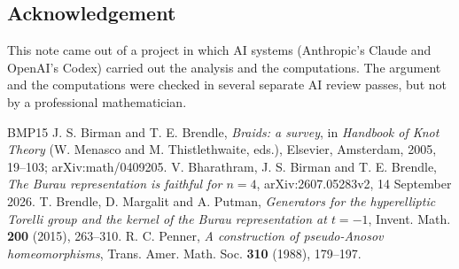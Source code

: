 \documentclass[11pt]{amsart}
\theoremstyle{remark}
\begin{document}
\subsection*{Acknowledgement}
This note came out of a project in which AI systems (Anthropic's Claude and OpenAI's Codex) carried out the analysis and the computations. The argument and the computations were checked in several separate AI review passes, but not by a professional mathematician.

\begin{thebibliography}{BMP15}
 J. S. Birman and T. E. Brendle, \emph{Braids: a survey}, in \emph{Handbook of Knot Theory} (W. Menasco and M. Thistlethwaite, eds.), Elsevier, Amsterdam, 2005, 19--103; arXiv:math/0409205.
 V. Bharathram, J. S. Birman and T. E. Brendle, \emph{The Burau representation is faithful for $n=4$}, arXiv:2607.05283v2, 14 September 2026.
 T. Brendle, D. Margalit and A. Putman, \emph{Generators for the hyperelliptic Torelli group and the kernel of the Burau representation at $t=-1$}, Invent. Math. \textbf{200} (2015), 263--310.
 R. C. Penner, \emph{A construction of pseudo-Anosov homeomorphisms}, Trans. Amer. Math. Soc. \textbf{310} (1988), 179--197.
\end{thebibliography}
\end{document}
